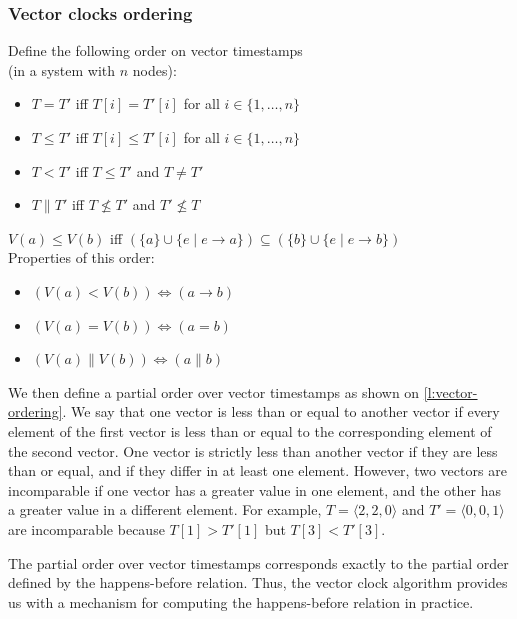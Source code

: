 \begin{frame}[label=vector-ordering]
    \label{s:vector-ordering}
    \frametitle{Vector clocks ordering}
    Define the following order on vector timestamps\\(in a system with $n$ nodes):
    \begin{itemize}
        \item $T = T'$ iff $T[i] = T'[i]$ for all $i \in \{1, \dots, n\}$
        \item $T \le T'$ iff $T[i] \le T'[i]$ for all $i \in \{1, \dots, n\}$
        \item $T < T'$ iff $T \le T'$ and $T \ne T'$
        \item $T \parallel T'$ iff $T \not\le T'$ and $T' \not\le T$\\[1em]
    \end{itemize}\pause
    $V(a) \le V(b)$ iff $(\{a\} \cup \{e \mid e \rightarrow a\}) \subseteq (\{b\} \cup \{e \mid e \rightarrow b\})$\\[1em]\pause
    Properties of this order:
    \begin{itemize}
        \item $(V(a) < V(b)) \Longleftrightarrow (a \rightarrow b)$
        \item $(V(a) = V(b)) \Longleftrightarrow (a = b)$
        \item $(V(a) \parallel V(b)) \Longleftrightarrow (a \parallel b)$
    \end{itemize}
\end{frame}
\label{l:vector-ordering}

We then define a partial order over vector timestamps as shown on \autoref{l:vector-ordering}.
We say that one vector is less than or equal to another vector if every element of the first vector is less than or equal to the corresponding element of the second vector.
One vector is strictly less than another vector if they are less than or equal, and if they differ in at least one element.
However, two vectors are incomparable if one vector has a greater value in one element, and the other has a greater value in a different element.
For example, $T = \langle 2, 2, 0\rangle$ and $T' = \langle 0, 0, 1\rangle$ are incomparable because $T[1] > T'[1]$ but $T[3] < T'[3]$.

The partial order over vector timestamps corresponds exactly to the partial order defined by the happens-before relation.
Thus, the vector clock algorithm provides us with a mechanism for computing the happens-before relation in practice.

